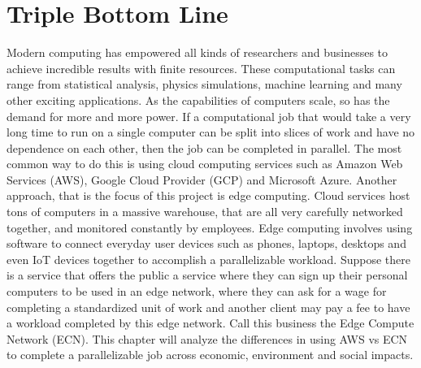 \documentclass[../mthe-493-final-project.tex]{subfiles}
\begin{document}
    \chapter{Triple Bottom Line}
    \label{ch:triple-bottom-line}



    Modern computing has empowered all kinds of researchers and businesses to achieve incredible results with finite resources. These computational tasks can range from statistical analysis, physics simulations, machine learning and many other exciting applications. As the capabilities of computers scale, so has the demand for more and more power. If a computational job that would take a very long time to run on a single computer can be split into slices of work and have no dependence on each other, then the job can be completed in parallel. The most common way to do this is using cloud computing services such as Amazon Web Services (AWS), Google Cloud Provider (GCP) and Microsoft Azure. Another approach, that is the focus of this project is edge computing. Cloud services host tons of computers in a massive warehouse, that are all very carefully networked together, and monitored constantly by employees. Edge computing involves using software to connect everyday user devices such as phones, laptops, desktops and even IoT devices together to accomplish a parallelizable workload. Suppose there is a service that offers the public a service where they can sign up their personal computers to be used in an edge network, where they can ask for a wage for completing a standardized unit of work and another client may pay a fee to have a workload completed by this edge network. Call this business the Edge Compute Network (ECN). This chapter will analyze the differences in using AWS vs ECN to complete a parallelizable job across economic, environment and social impacts. 
    
\end{document}
